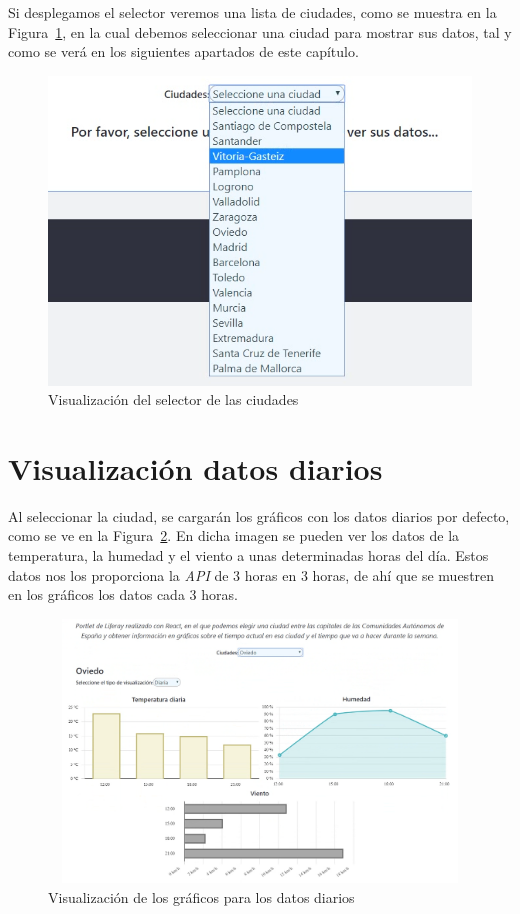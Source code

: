\documentclass[a4paper, 12pt]{book}
\begin{document}
\vspace{5mm}
Si desplegamos el selector veremos una lista de ciudades, como se muestra en la Figura~\ref{fig:seleccion_ciudad}, en la cual debemos seleccionar una ciudad para mostrar sus datos, tal y como se verá en los siguientes apartados de este capítulo.
\begin{figure}[h]
  \centering
  \includegraphics{img_usadas/seleccion_ciudad.png}
  \caption{Visualización del selector de las ciudades}
  \label{fig:seleccion_ciudad}
\end{figure}



\section{Visualización datos diarios}
\label{sec:visualizacion-diaria}
Al seleccionar la ciudad, se cargarán los gráficos con los datos diarios por defecto, como se ve en la Figura~\ref{fig:pantalla_diaria}. En dicha imagen se pueden ver los datos de la temperatura, la humedad y el viento a unas determinadas horas del día. Estos datos nos los proporciona la \textit{API} de 3 horas en 3 horas, de ahí que se muestren en los gráficos los datos cada 3 horas.
\begin{figure}[h]
  \centering
  \includegraphics[width=13cm, height=7cm]{img_usadas/pantalla_diaria.png}
  \caption{Visualización de los gráficos para los datos diarios}
  \label{fig:pantalla_diaria}
\end{figure}
\end{document}
